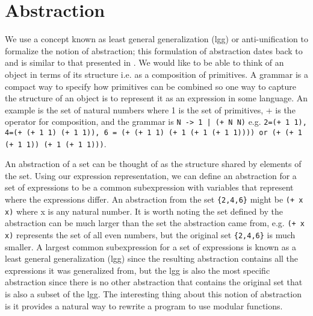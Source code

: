\documentclass[a4paper,10pt]{article}
\begin{document}
\section{Abstraction}
We use a concept known as least general generalization (lgg) or anti-unification to formalize the notion of abstraction; this formulation of abstraction dates back to \cite{Plotkin1970} and is similar to that presented in \cite{Olsson99howto}.  We would like to be able to think of an object in terms of its structure i.e. as a composition of primitives.  A grammar is a compact way to specify how primitives can be combined so one way to capture the structure of an object is to represent it as an expression in some language.  An example is the set of natural numbers where {1} is the set of primitives, + is the operator for composition, and the grammar is \texttt{N -> 1 | (+ N N)} e.g. \texttt{2=(+ 1 1), 4=(+ (+ 1 1) (+ 1 1)), 6 = (+ (+ 1 1) (+ 1 (+ 1 (+ 1 1)))) or (+ (+ 1 (+ 1 1)) (+ 1 (+ 1 1)))}.

An abstraction of a set can be thought of as the structure shared by elements of the set.  Using our expression representation, we can define an abstraction for a set of expressions to be a common subexpression with variables that represent where the expressions differ.    An abstraction from the set \texttt{\{2,4,6\}} might be \texttt{(+ x x)} where x is any natural number.  It is worth noting the set defined by the abstraction can be much larger than the set the abstraction came from, e.g. \texttt{(+ x x)} represents the set of all even numbers, but the original set \texttt{\{2,4,6\}} is much smaller.  A largest common subexpression for a set of expressions is known as a least general generalization (lgg) since the resulting abstraction contains all the expressions it was generalized from, but the lgg is also the most specific abstraction since there is no other abstraction that contains the original set that is also a subset of the lgg.  The interesting thing about this notion of abstraction is it provides a natural way to rewrite a program to use modular functions.
\end{document}
